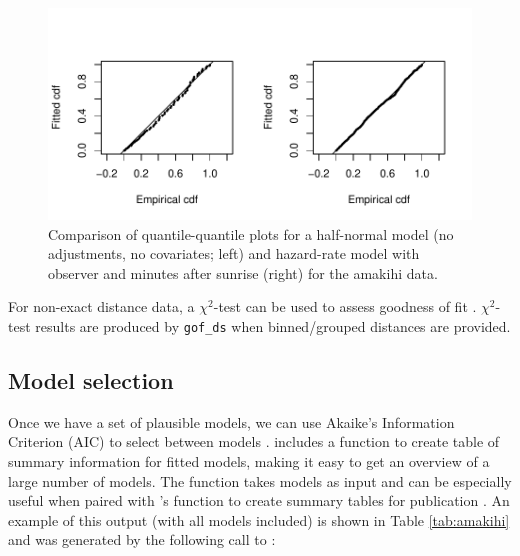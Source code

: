 \documentclass[article,shortnames]{jss}
\begin{document}
\begin{CodeChunk}
\begin{figure}

{\centering \includegraphics{paper_files/figure-latex/amakihi-qq-comp-1} 

}

\caption[Comparison of quantile-quantile plots for a half-normal model (no adjustments, no covariates]{Comparison of quantile-quantile plots for a half-normal model (no adjustments, no covariates; left) and hazard-rate model with observer and minutes after sunrise (right) for the amakihi data.\label{amakihi-qq}}\label{fig:amakihi-qq-comp}
\end{figure}
\end{CodeChunk}

For non-exact distance data, a \(\chi^2\)-test can be used to assess
goodness of fit \citep[see][Section 3.4.4]{Buckland:2001vm}.
\(\chi^2\)-test results are produced by \texttt{gof\_ds} when
binned/grouped distances are provided.

\subsection{Model selection}\label{model-selection}

Once we have a set of plausible models, we can use Akaike's Information
Criterion (AIC) to select between models \citep[see
e.g.][]{burnham2003model}.  includes a function to create
table of summary information for fitted models, making it easy to get an
overview of a large number of models. The 
function takes models as input and can be especially useful when paired
with 's  function to create summary tables for
publication \citep{knitr-pkg}. An example of this output (with all
models included) is shown in Table \ref{tab:amakihi} and was generated
by the following call to :
\end{document}
